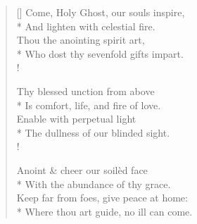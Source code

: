 \documentclass[MAIN]{subfiles}
\begin{document}
\settowidth{\versewidth}{Come, Holy Ghost, our souls inspire,}
\begin{verse}[\versewidth]
Come, Holy Ghost, our souls inspire,\\*
And lighten with celestial fire.\\
Thou the anointing spirit art,\\*
Who dost thy sevenfold gifts impart.\\!

Thy blessed unction from above\\*
Is comfort, life, and fire of love.\\
Enable with perpetual light\\*
The dullness of our blinded sight.\\!

Anoint \& cheer our soil\`ed face\\*
With the abundance of thy grace.\\
Keep far from foes, give peace at home:\\*
Where thou art guide, no ill can come.
\end{verse}
\end{document}
